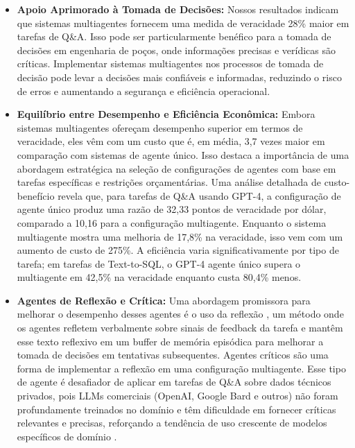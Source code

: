             \begin{itemize}
                \item \textbf{Apoio Aprimorado à Tomada de Decisões:}            
                    Nossos resultados indicam que sistemas multiagentes fornecem uma medida de veracidade 28\% maior em tarefas de Q\&A. Isso pode ser particularmente benéfico para a tomada de decisões em engenharia de poços, onde informações precisas e verídicas são críticas.
                    Implementar sistemas multiagentes nos processos de tomada de decisão pode levar a decisões mais confiáveis e informadas, reduzindo o risco de erros e aumentando a segurança e eficiência operacional.
                
                
                \item \textbf{Equilíbrio entre Desempenho e Eficiência Econômica:}          
                    Embora sistemas multiagentes ofereçam desempenho superior em termos de veracidade, eles vêm com um custo que é, em média, 3,7 vezes maior em comparação com sistemas de agente único.
                    Isso destaca a importância de uma abordagem estratégica na seleção de configurações de agentes com base em tarefas específicas e restrições orçamentárias.
                    Uma análise detalhada de custo-benefício revela que, para tarefas de Q\&A usando GPT-4, a configuração de agente único produz uma razão de 32,33 pontos de veracidade por dólar, comparado a 10,16 para a configuração multiagente. Enquanto o sistema multiagente mostra uma melhoria de 17,8\% na veracidade, isso vem com um aumento de custo de 275\%. A eficiência varia significativamente por tipo de tarefa; em tarefas de Text-to-SQL, o GPT-4 agente único supera o multiagente em 42,5\% na veracidade enquanto custa 80,4\% menos.
                
            
                \item \textbf{Agentes de Reflexão e Crítica:}            
                    Uma abordagem promissora para melhorar o desempenho desses agentes é o uso da reflexão \cite{Shinn2023}, um método onde os agentes refletem verbalmente sobre sinais de feedback da tarefa e mantêm esse texto reflexivo em um buffer de memória episódica para melhorar a tomada de decisões em tentativas subsequentes.
                    Agentes críticos são uma forma de implementar a reflexão em uma configuração multiagente. Esse tipo de agente é desafiador de aplicar em tarefas de Q\&A sobre dados técnicos privados, pois LLMs comerciais (OpenAI, Google Bard e outros) não foram profundamente treinados no domínio e têm dificuldade em fornecer críticas relevantes e precisas, reforçando a tendência de uso crescente de modelos específicos de domínio \cite{Shah2024, Meena2023, Ghosh2023}.
                

\end{itemize}
